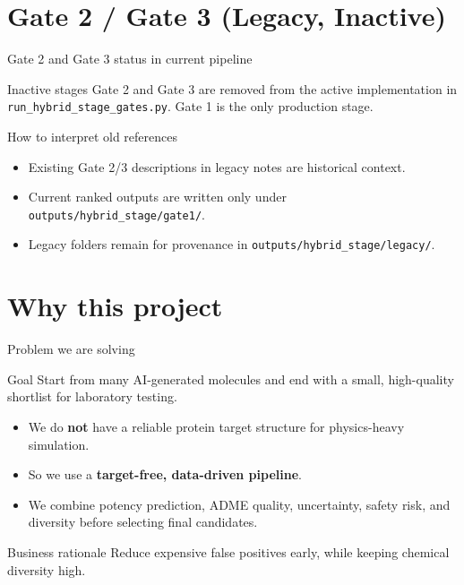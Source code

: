 \documentclass[aspectratio=169,10pt]{beamer}
\begin{document}
\section{Gate 2 / Gate 3 (Legacy, Inactive)}

\begin{frame}{Gate 2 and Gate 3 status in current pipeline}
  \small
  \begin{alertblock}{Inactive stages}
    Gate 2 and Gate 3 are removed from the active implementation in
    \texttt{run\_hybrid\_stage\_gates.py}. Gate 1 is the only production stage.
  \end{alertblock}

  \begin{block}{How to interpret old references}
    \begin{itemize}
      \item Existing Gate 2/3 descriptions in legacy notes are historical context.
      \item Current ranked outputs are written only under \texttt{outputs/hybrid\_stage/gate1/}.
      \item Legacy folders remain for provenance in \texttt{outputs/hybrid\_stage/legacy/}.
    \end{itemize}
  \end{block}
\end{frame}

\section{Why this project}

\begin{frame}{Problem we are solving}
  \begin{block}{Goal}
    Start from many AI-generated molecules and end with a small, high-quality
    shortlist for laboratory testing.
  \end{block}

  \vspace{3pt}
  \begin{itemize}
    \item We do \textbf{not} have a reliable protein target structure for physics-heavy simulation.
    \item So we use a \textbf{target-free, data-driven pipeline}.
    \item We combine potency prediction, ADME quality, uncertainty, safety risk,
          and diversity before selecting final candidates.
  \end{itemize}

  \vspace{4pt}
  \begin{alertblock}{Business rationale}
    Reduce expensive false positives early, while keeping chemical diversity high.
  \end{alertblock}
\end{frame}
\end{document}
